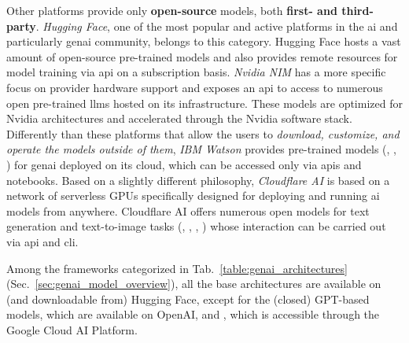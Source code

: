 Other platforms provide only \textbf{open-source} models, both \textbf{first- and third-party}. 
\emph{Hugging Face}, one of the most popular and active platforms in the \gls{ai} and particularly \gls{genai} community, belongs to this category. 
Hugging Face hosts a vast amount of open-source pre-trained models and also provides remote resources for model training via \gls{api} on a subscription basis. 
\emph{Nvidia NIM} has a more specific focus on provider hardware support and exposes an \gls{api} to access to numerous open pre-trained \glspl{llm} hosted on its infrastructure. These models are optimized for Nvidia architectures and accelerated through the Nvidia software stack.
Differently than these platforms that allow the users to \emph{download, customize, and operate the models outside of them}, \emph{IBM Watson} provides pre-trained models (\eg {}, , ) for \gls{genai} deployed on its cloud, which can be accessed only via \glspl{api} and notebooks.
Based on a slightly different philosophy, \emph{Cloudflare AI} is based on a network of serverless GPUs specifically designed for deploying and running \gls{ai} models from anywhere. 
Cloudflare AI offers numerous open models for text generation and text-to-image tasks (\eg {}, , , ) whose interaction can be carried out via \gls{api} and \gls{cli}.

Among the frameworks categorized in Tab.~\ref{table:genai_architectures} (\cf Sec.~\ref{sec:genai_model_overview}), all the base architectures are available on (and downloadable from) Hugging Face, except for the (closed) GPT-based models, which are available on OpenAI, and , which is accessible through the Google Cloud AI Platform.






